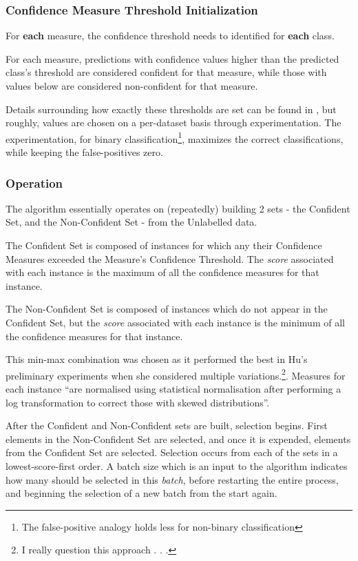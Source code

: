 \documentclass[a4paper,11pt]{report}
\begin{document}
\subsubsection{Confidence Measure Threshold Initialization}
For \textbf{each} measure, the confidence threshold needs to identified for \textbf{each} class.

For each measure, predictions with confidence values higher than the predicted class's threshold are considered confident for that measure, while those with values below are considered non-confident for that measure.

Details surrounding how exactly these thresholds are set can be found in \citet{Delany2005}, but roughly, values are chosen on a per-dataset basis through experimentation. The experimentation, for binary classification\footnote{The false-positive analogy holds less for non-binary classification}, maximizes the correct classifications, while keeping the false-positives zero.

\subsubsection{Operation}
The algorithm essentially operates on (repeatedly) building 2 sets - the Confident Set, and the Non-Confident Set - from the Unlabelled data.

The Confident Set is composed of instances for which any their Confidence Measures exceeded the Measure's Confidence Threshold. The \emph{score} associated with each instance is the maximum of all the confidence measures for that instance.

The Non-Confident Set is composed of instances which do not appear in the Confident Set, but the \emph{score} associated with each instance is the minimum of all the confidence measures for that instance. 

This min-max combination was chosen as it performed the best in Hu's preliminary experiments when she considered multiple variations.\footnote{I really question this approach . . .}. Measures for each instance ``are normalised using statistical normalisation after performing a log transformation to correct those with skewed distributions''\cite{Hu2011}.

After the Confident and Non-Confident sets are built, selection begins. First elements in the Non-Confident Set are selected, and once it is expended, elements from the Confident Set are selected. Selection occurs from each of the sets in a lowest-score-first order. A batch size which is an input to the algorithm indicates how many should be selected in this \emph{batch}, before restarting the entire process, and beginning the selection of a new batch from the start again.
\end{document}
